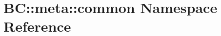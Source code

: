 \hypertarget{namespaceBC_1_1meta_1_1common}{}\section{BC\+:\+:meta\+:\+:common Namespace Reference}
\label{namespaceBC_1_1meta_1_1common}
